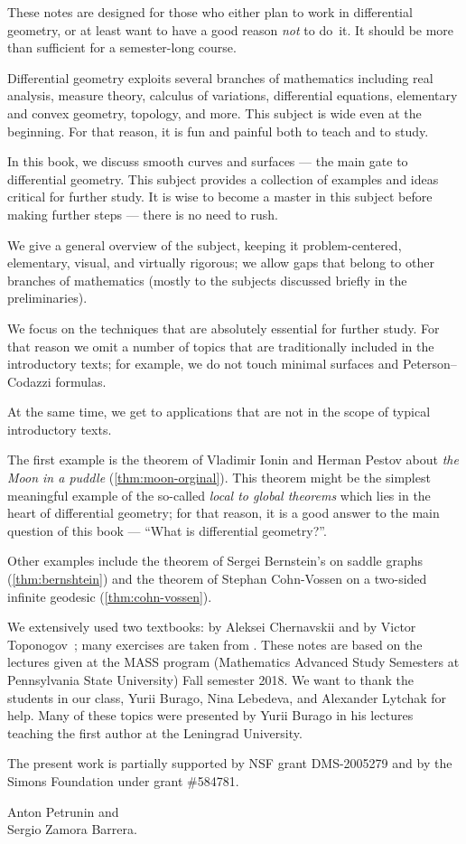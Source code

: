 \vfill

\newpage
{}
{}
\thispagestyle{myheadings}

These notes are designed for those who either plan to work in differential geometry,
or at least want to have a good reason {}\emph{not} to do~it.
It should be more than sufficient for a semester-long course. 

Differential geometry exploits several branches of mathematics including 
real analysis, 
measure theory,
calculus of variations,
differential equations,
elementary and convex geometry,
topology, and more.
This subject is wide even at the beginning. 
For that reason, it is fun and painful both to teach and to study.

In this book, we discuss smooth curves and surfaces --- the main gate to differential geometry.
This subject provides a collection of examples and ideas critical for further study.
It is wise to become a master in this subject before making further steps --- there is no need to rush.

We give a general overview of the subject, keeping it
problem-centered,
elementary, 
visual, 
and virtually rigorous; we allow gaps that belong to other branches of mathematics (mostly to the subjects discussed briefly in the preliminaries).

We focus on the techniques that are absolutely essential for further study.
For  that reason we omit a number of topics that are traditionally included in the introductory texts;
for example, we do not touch 
minimal surfaces
and Peterson--Codazzi formulas.

At the same time, we get to applications
 that are not in the scope of typical introductory texts.
 
The first example is the theorem of Vladimir Ionin and Herman Pestov about {}\emph{the Moon in a puddle} (\ref{thm:moon-orginal}).
This theorem might be the simplest meaningful example of the so-called {}\emph{local to global theorems} which lies in the heart of differential geometry;
for that reason, it is a good answer to the main question of this book --- ``What is differential geometry?''.

Other examples include the theorem of Sergei Bernstein's on saddle graphs (\ref{thm:bernshtein}) and the theorem of Stephan Cohn-Vossen
on a two-sided infinite geodesic (\ref{thm:cohn-vossen}).

We extensively used two textbooks: by Aleksei Chernavskii \cite{chernavsky} and by Victor Toponogov~\cite{toponogov-book};
many exercises are taken from \cite{petrunin2021pigtikal}.
These notes are based on the lectures given at the MASS program (Mathematics Advanced Study Semesters at Pennsylvania State University) Fall semester 2018.
We want to thank the students in our class, 
Yurii Burago, 
Nina Lebedeva,
and
Alexander Lytchak
for help.
Many of these topics were presented by Yurii Burago in his lectures teaching the first author at the Leningrad University.

The present work is partially supported by NSF grant DMS-2005279
and by the Simons Foundation under grant \#584781.

\begin{flushright}
Anton Petrunin and\\
Sergio Zamora Barrera.
\end{flushright}




